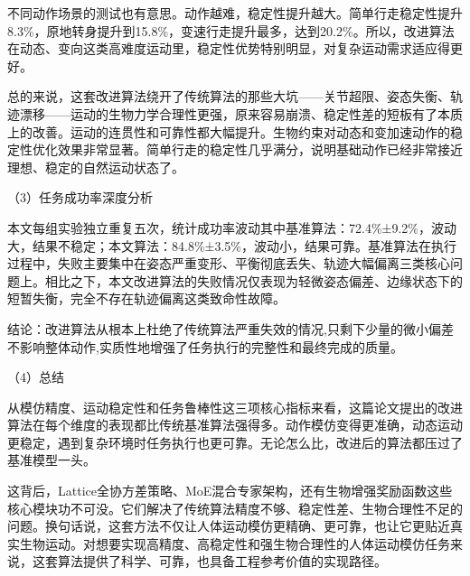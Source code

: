 不同动作场景的测试也有意思。动作越难，稳定性提升越大。简单行走稳定性提升8.3\%，原地转身提升到15.8\%，变速行走提升最多，达到20.2\%。所以，改进算法在动态、变向这类高难度运动里，稳定性优势特别明显，对复杂运动需求适应得更好。

总的来说，这套改进算法绕开了传统算法的那些大坑——关节超限、姿态失衡、轨迹漂移——运动的生物力学合理性更强，原来容易崩溃、稳定性差的短板有了本质上的改善。运动的连贯性和可靠性都大幅提升。生物约束对动态和变加速动作的稳定性优化效果非常显著。简单行走的稳定性几乎满分，说明基础动作已经非常接近理想、稳定的自然运动状态了。

（3）任务成功率深度分析

本文每组实验独立重复五次，统计成功率波动其中基准算法：72.4\%±9.2\%，波动大，结果不稳定；本文算法：84.8\%±3.5\%，波动小，结果可靠。基准算法在执行过程中，失败主要集中在姿态严重变形、平衡彻底丢失、轨迹大幅偏离三类核心问题上。相比之下，本文改进算法的失败情况仅表现为轻微姿态偏差、边缘状态下的短暂失衡，完全不存在轨迹偏离这类致命性故障。

结论：改进算法从根本上杜绝了传统算法严重失效的情况,只剩下少量的微小偏差不影响整体动作,实质性地增强了任务执行的完整性和最终完成的质量。

（4）总结

从模仿精度、运动稳定性和任务鲁棒性这三项核心指标来看，这篇论文提出的改进算法在每个维度的表现都比传统基准算法强得多。动作模仿变得更准确，动态运动更稳定，遇到复杂环境时任务执行也更可靠。无论怎么比，改进后的算法都压过了基准模型一头。

这背后，Lattice全协方差策略、MoE混合专家架构，还有生物增强奖励函数这些核心模块功不可没。它们解决了传统算法精度不够、稳定性差、生物合理性不足的问题。换句话说，这套方法不仅让人体运动模仿更精确、更可靠，也让它更贴近真实生物运动。对想要实现高精度、高稳定性和强生物合理性的人体运动模仿任务来说，这套算法提供了科学、可靠，也具备工程参考价值的实现路径。
